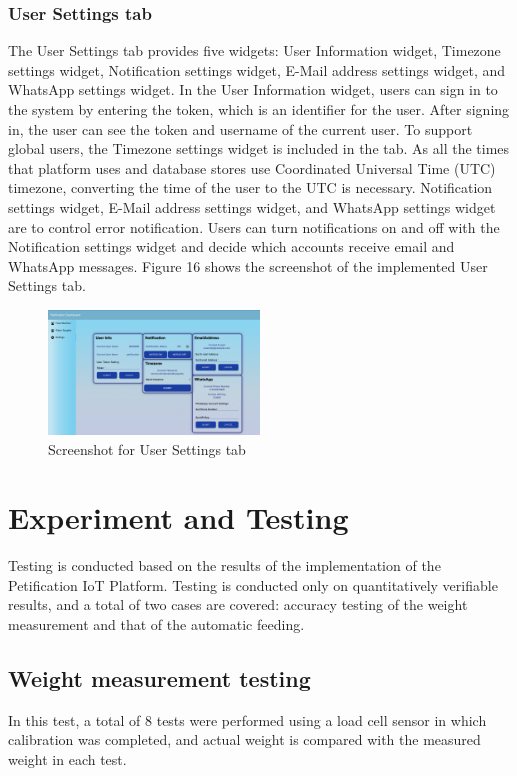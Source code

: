 \documentclass[conference]{IEEEtran}
\begin{document}
\subsubsection{User Settings tab}
The User Settings tab provides five widgets: User Information widget, Timezone settings widget, Notification settings widget, E-Mail address settings widget, and WhatsApp settings widget. 
In the User Information widget, users can sign in to the system by entering the token, which is an identifier for the user. After signing in, the user can see the token and username of the current user.
To support global users, the Timezone settings widget is included in the tab. As all the times that platform uses and database stores use Coordinated Universal Time (UTC) timezone, converting the time of the user to the UTC is necessary.
Notification settings widget, E-Mail address settings widget, and WhatsApp settings widget are to control error notification. Users can turn notifications on and off with the Notification settings widget and decide which accounts receive email and WhatsApp messages. Figure 16 shows the screenshot of the implemented User Settings tab.

\begin{figure}[htbp]
\centerline{\includegraphics[width=0.5\textwidth]{./images/user_settings_ui.png}}
\caption{Screenshot for User Settings tab}
\label{fig}
\end{figure}

\section{Experiment and Testing}
Testing is conducted based on the results of the implementation of the Petification IoT Platform. Testing is conducted only on quantitatively verifiable results, and a total of two cases are covered: accuracy testing of the weight measurement and that of the automatic feeding.

\subsection{Weight measurement testing}
In this test, a total of 8 tests were performed using a load cell sensor in which calibration was completed, and actual weight is compared with the measured weight in each test.
\end{document}
